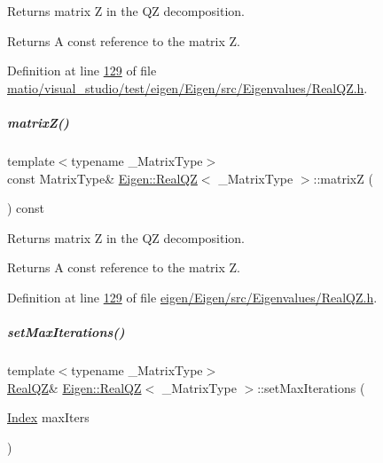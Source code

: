 Returns matrix Z in the QZ decomposition. 

\begin{DoxyReturn}{Returns}
A const reference to the matrix Z. 
\end{DoxyReturn}


Definition at line \hyperlink{matio_2visual__studio_2test_2eigen_2_eigen_2src_2_eigenvalues_2_real_q_z_8h_source_l00129}{129} of file \hyperlink{matio_2visual__studio_2test_2eigen_2_eigen_2src_2_eigenvalues_2_real_q_z_8h_source}{matio/visual\+\_\+studio/test/eigen/\+Eigen/src/\+Eigenvalues/\+Real\+Q\+Z.\+h}.

\mbox{\label{group___eigenvalues___module_a19a116383f11423179b4d8f316da6f67}} 
\subparagraph{\texorpdfstring{matrix\+Z()}{matrixZ()}\hspace{0.1cm}{\footnotesize\ttfamily [2/2]}}
{\footnotesize\ttfamily template$<$typename \+\_\+\+Matrix\+Type$>$ \\
const Matrix\+Type\& \hyperlink{group___eigenvalues___module_class_eigen_1_1_real_q_z}{Eigen\+::\+Real\+QZ}$<$ \+\_\+\+Matrix\+Type $>$\+::matrixZ (\begin{DoxyParamCaption}{ }\end{DoxyParamCaption}) const\hspace{0.3cm}{\ttfamily [inline]}}



Returns matrix Z in the QZ decomposition. 

\begin{DoxyReturn}{Returns}
A const reference to the matrix Z. 
\end{DoxyReturn}


Definition at line \hyperlink{eigen_2_eigen_2src_2_eigenvalues_2_real_q_z_8h_source_l00129}{129} of file \hyperlink{eigen_2_eigen_2src_2_eigenvalues_2_real_q_z_8h_source}{eigen/\+Eigen/src/\+Eigenvalues/\+Real\+Q\+Z.\+h}.

\mbox{\label{group___eigenvalues___module_a30ae65666b1757e4a2b6a28eaec12226}} 
\subparagraph{\texorpdfstring{set\+Max\+Iterations()}{setMaxIterations()}\hspace{0.1cm}{\footnotesize\ttfamily [1/2]}}
{\footnotesize\ttfamily template$<$typename \+\_\+\+Matrix\+Type$>$ \\
\hyperlink{group___eigenvalues___module_class_eigen_1_1_real_q_z}{Real\+QZ}\& \hyperlink{group___eigenvalues___module_class_eigen_1_1_real_q_z}{Eigen\+::\+Real\+QZ}$<$ \+\_\+\+Matrix\+Type $>$\+::set\+Max\+Iterations (\begin{DoxyParamCaption}\item[{\hyperlink{group___eigenvalues___module_a6201e534e901b5f4e66f72c176b534a3}{Index}}]{max\+Iters }\end{DoxyParamCaption})\hspace{0.3cm}{\ttfamily [inline]}}

